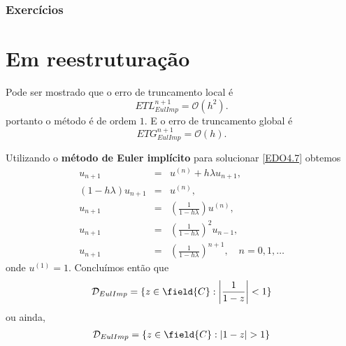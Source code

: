 
%



\emconstrucao

\subsection*{Exercícios}

\emconstrucao




\chapter{Em reestruturação}

Pode ser mostrado que o erro de truncamento local é
$$ETL_{EulImp}^{n+1}= \mathcal{O}(h^2).$$
portanto o método é de ordem $1$. E o erro de truncamento global é
$$ETG_{EulImp}^{n+1}= \mathcal{O}(h).$$



\begin{ex}
Utilizando o \textbf{método de Euler implícito} para solucionar \eqref{EDO4.7} obtemos
\begin{eqnarray}
 u_{n+1}      &=& u^{(n)}+h\lambda u_{n+1}, \\
 (1-h\lambda )u_{n+1} & =& u^{(n)}, \\
       u_{n+1} & =& \left(\frac{1}{1- h\lambda }\right)u^{(n)}, \\
       u_{n+1} & =& \left(\frac{1}{1- h\lambda }\right)^2u_{n-1}, \\
       u_{n+1} & =& \left(\frac{1}{1- h\lambda }\right)^{n+1}, \quad  n=0,1,\ldots
\end{eqnarray}
onde $u^{(1)}=1$.
Concluímos então que
\begin{eqnarray}
 \mathcal D_{EulImp} = \{z \in  \field{C}:  \left|\frac{1}{1- z}\right|<1\}
\end{eqnarray}
ou ainda,
\begin{eqnarray}
 \mathcal D_{EulImp} = \{z \in  \field{C}:  |1- z|>1\}
\end{eqnarray}


\end{ex}




































